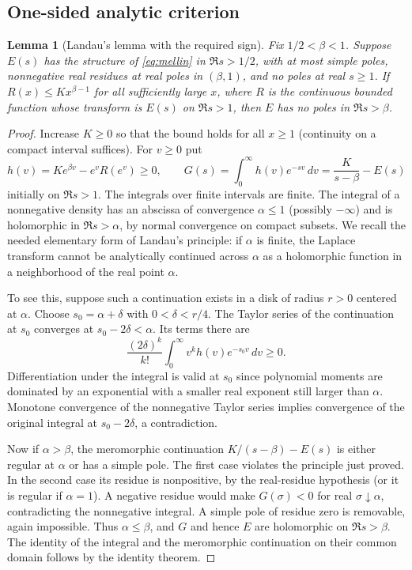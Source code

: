 \documentclass[11pt,letterpaper]{article}
\newtheorem{lemma}[theorem]{Lemma}
\theoremstyle{remark}\newtheorem{remark}[theorem]{Remark}
\begin{document}
\subsection{One-sided analytic criterion}
\begin{lemma}[Landau's lemma with the required sign]\label{lem:landau}
Fix $1/2<\beta<1$. Suppose $E(s)$ has the structure of \eqref{eq:mellin} in $\Re s>1/2$, with at most simple poles, nonnegative real residues at real poles in $(\beta,1)$, and no poles at real $s\ge1$. If $R(x)\le K x^{\beta-1}$ for all sufficiently large $x$, where $R$ is the continuous bounded function whose transform is $E(s)$ on $\Re s>1$, then $E$ has no poles in $\Re s>\beta$.
\end{lemma}
\begin{proof}
Increase $K\ge0$ so that the bound holds for all $x\ge1$ (continuity on a compact interval suffices). For $v\ge0$ put
\[
 h(v)=Ke^{\beta v}-e^vR(e^v)\ge0,
 \qquad G(s)=\int_0^\infty h(v)e^{-sv}\,dv=\frac{K}{s-\beta}-E(s)
\]
initially on $\Re s>1$. The integrals over finite intervals are finite. The integral of a nonnegative density has an abscissa of convergence $\alpha\le1$ (possibly $-\infty$) and is holomorphic in $\Re s>\alpha$, by normal convergence on compact subsets. We recall the needed elementary form of Landau's principle: if $\alpha$ is finite, the Laplace transform cannot be analytically continued across $\alpha$ as a holomorphic function in a neighborhood of the real point $\alpha$.

To see this, suppose such a continuation exists in a disk of radius $r>0$ centered at $\alpha$. Choose $s_0=\alpha+\delta$ with $0<\delta<r/4$. The Taylor series of the continuation at $s_0$ converges at $s_0-2\delta<\alpha$. Its terms there are
\[
 \frac{(2\delta)^k}{k!}\int_0^\infty v^kh(v)e^{-s_0v}\,dv\ge0.
\]
Differentiation under the integral is valid at $s_0$ since polynomial moments are dominated by an exponential with a smaller real exponent still larger than $\alpha$. Monotone convergence of the nonnegative Taylor series implies convergence of the original integral at $s_0-2\delta$, a contradiction.

Now if $\alpha>\beta$, the meromorphic continuation $K/(s-\beta)-E(s)$ is either regular at $\alpha$ or has a simple pole. The first case violates the principle just proved. In the second case its residue is nonpositive, by the real-residue hypothesis (or it is regular if $\alpha=1$). A negative residue would make $G(\sigma)<0$ for real $\sigma\downarrow\alpha$, contradicting the nonnegative integral. A simple pole of residue zero is removable, again impossible. Thus $\alpha\le\beta$, and $G$ and hence $E$ are holomorphic on $\Re s>\beta$. The identity of the integral and the meromorphic continuation on their common domain follows by the identity theorem.
\end{proof}
\end{document}
